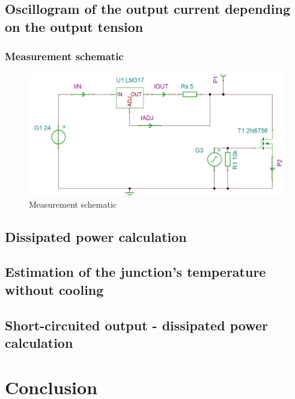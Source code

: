 \subsection{Oscillogram of the output current depending on the output tension} \label{ssec:num13}
{
	
\subsubsection{Measurement schematic}
\begin{figure}[h]
	\centering
	\includegraphics[width=0.8\linewidth]{../../schemaMesurePulses}
	\caption{Measurement schematic}
	\label{fig:schemamesurepulses}
\end{figure}


}
\clearpage

\subsection{Dissipated power calculation} \label{ssec:num14}
{}
\subsection{Estimation of the junction's temperature without cooling} \label{ssec:num15}
{}
\subsection{Short-circuited output - dissipated power calculation} \label{ssec:num16}
{}

\section{Conclusion}
{}

\clearpage